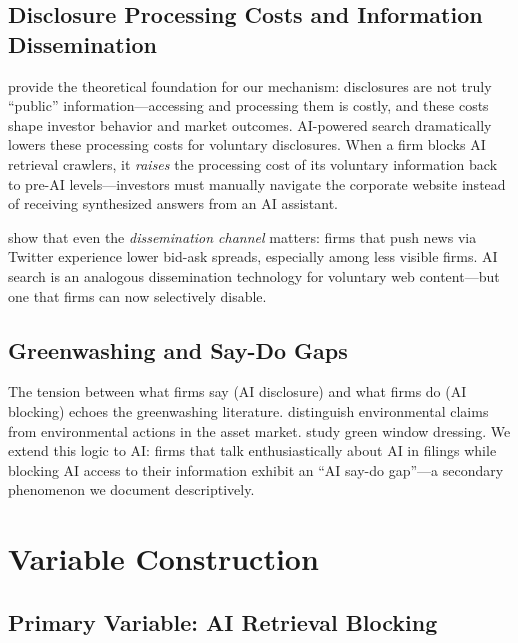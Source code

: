 \documentclass[12pt,a4paper]{article}
\begin{document}
\subsection{Disclosure Processing Costs and Information Dissemination}

\citet{BlankespoorDeHaanMarinovic2020} provide the theoretical foundation for our mechanism: disclosures are not truly ``public'' information---accessing and processing them is costly, and these costs shape investor behavior and market outcomes. AI-powered search dramatically lowers these processing costs for voluntary disclosures. When a firm blocks AI retrieval crawlers, it \emph{raises} the processing cost of its voluntary information back to pre-AI levels---investors must manually navigate the corporate website instead of receiving synthesized answers from an AI assistant.

\citet{BlankespoorMillerWhite2014} show that even the \emph{dissemination channel} matters: firms that push news via Twitter experience lower bid-ask spreads, especially among less visible firms. AI search is an analogous dissemination technology for voluntary web content---but one that firms can now selectively disable.

\subsection{Greenwashing and Say-Do Gaps}

The tension between what firms say (AI disclosure) and what firms do (AI blocking) echoes the greenwashing literature. \citet{DuchinGaoXu2025} distinguish environmental claims from environmental actions in the asset market. \citet{PariseRubin2025} study green window dressing. We extend this logic to AI: firms that talk enthusiastically about AI in filings while blocking AI access to their information exhibit an ``AI say-do gap''---a secondary phenomenon we document descriptively.

\section{Variable Construction}

\subsection{Primary Variable: AI Retrieval Blocking}
\end{document}
